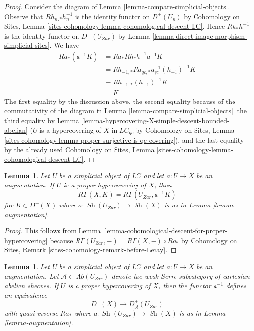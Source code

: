 \documentclass{stacks-project}
\theoremstyle{plain}
\newtheorem{lemma}[subsection]{Lemma}
\theoremstyle{definition}
\theoremstyle{remark}
\numberwithin{equation}{subsection}
\def\Sh{\mathop{\mathit{Sh}}\nolimits}
\begin{document}
\begin{proof}
Consider the diagram of Lemma \ref{lemma-compare-simplicial-objects}.
Observe that $Rh_{n, *}h_n^{-1}$ is the identity functor
on $D^+(U_n)$ by Cohomology on Sites, Lemma
\ref{sites-cohomology-lemma-cohomological-descent-LC}.
Hence $Rh_*h^{-1}$ is the identity functor on
$D^+(U_{Zar})$ by
Lemma \ref{lemma-direct-image-morphism-simplicial-sites}.
We have
\begin{align*}
Ra_*(a^{-1}K)
& =
Ra_*Rh_*h^{-1}a^{-1}K \\
& =
Rh_{-1, *}Ra_{qc, *}a_{qc}^{-1}(h_{-1})^{-1}K \\
& =
Rh_{-1, *}(h_{-1})^{-1}K \\
& =
K
\end{align*}
The first equality by the discussion above, the second equality
because of the commutativity of the diagram in
Lemma \ref{lemma-compare-simplicial-objects}, the third equality by
Lemma \ref{lemma-hypercovering-X-simple-descent-bounded-abelian}
($U$ is a hypercovering of $X$ in $\textit{LC}_{qc}$ by
Cohomology on Sites, Lemma
\ref{sites-cohomology-lemma-proper-surjective-is-qc-covering}),
and the last equality by the already used Cohomology on Sites, Lemma
\ref{sites-cohomology-lemma-cohomological-descent-LC}.
\end{proof}

\begin{lemma}
\label{lemma-compute-via-proper-hypercovering}
Let $U$ be a simplicial object of $\textit{LC}$ and let $a : U \to X$
be an augmentation. If $U$ is a proper hypercovering of $X$, then
$$
R\Gamma(X, K) = R\Gamma(U_{Zar}, a^{-1}K)
$$
for $K \in D^+(X)$ where $a : \Sh(U_{Zar}) \to \Sh(X)$
is as in Lemma \ref{lemma-augmentation}.
\end{lemma}

\begin{proof}
This follows from
Lemma \ref{lemma-cohomological-descent-for-proper-hypercovering}
because $R\Gamma(U_{Zar}, -) = R\Gamma(X, -) \circ Ra_*$ by
Cohomology on Sites, Remark \ref{sites-cohomology-remark-before-Leray}.
\end{proof}

\begin{lemma}
\label{lemma-proper-hypercovering-equivalence-bounded}
Let $U$ be a simplicial object of $\textit{LC}$ and let $a : U \to X$
be an augmentation.
Let $\mathcal{A} \subset \textit{Ab}(U_{Zar})$
denote the weak Serre subcategory of cartesian abelian sheaves.
If $U$ is a proper hypercovering of $X$, then
the functor $a^{-1}$ defines an equivalence
$$
D^+(X) \longrightarrow D_\mathcal{A}^+(U_{Zar})
$$
with quasi-inverse $Ra_*$ where $a : \Sh(U_{Zar}) \to \Sh(X)$
is as in Lemma \ref{lemma-augmentation}.
\end{lemma}
\end{document}
